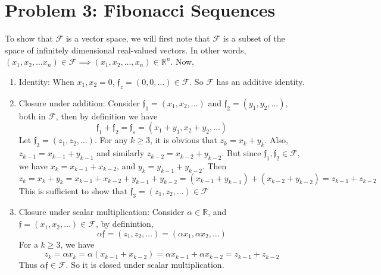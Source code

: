 \documentclass{article}
\begin{document}
\section*{Problem 3: Fibonacci Sequences}
 To show that $\mathcal{F}$ is a vector space, we will first note that $\mathcal{F}$ is a subset of the space of infinitely dimensional real-valued vectors. In other words, $(x_{1},x_{2},\dots x_{n})\in \mathcal{F} \implies (x_{1},x_{2},\dots, x_{n})\in\mathbb{R}^{n}$. Now,
\begin{enumerate}
    \item Identity: When $x_{1}, x_{2} = 0$, $\mathfrak{f}_{z} = (0,0,\dots) \in \mathcal{F}$. So $\mathcal{F}$ has an additive identity.
    \item Closure under addition: Consider $\mathfrak{f}_{1} = (x_{1},x_{2},\dots)$ and $\mathfrak{f}_{2} = (y_{1}, y_{2}, \dots)$, both in $\mathcal{F}$, then by definition we have
    \begin{equation*}
        \mathfrak{f}_{1} + \mathfrak{f}_{2} = \mathfrak{f}_{s} = (x_{1} + y_{1}, x_{2} + y_{2}, \dots)
    \end{equation*}
    Let $\mathfrak{f}_{3} = (z_{1}, z_{2}, \dots)$. For any $k \geq 3$, it is obvious that $z_{k} = x_{k} + y_{k}$. Also, $z_{k - 1} = x_{k-1} + y_{k-1}$ and similarly $z_{k-2} = x_{k-2} + y_{k-2}$. But since $\mathfrak{f}_{1},\mathfrak{f}_{2}\in \mathcal{F}$, we have $x_{k} = x_{k - 1} + x_{k-2}$, and $y_{k} = y_{k-1} + y_{k-2}$. Then
    \begin{equation*}
        z_{k} = x_{k} + y_{k} = x_{k-1} + x_{k-2} + y_{k-1} + y_{k-2} = (x_{k-1} + y_{k-1}) + (x_{k-2} + y_{k-2}) = z_{k-1} + z_{k-2}
    \end{equation*}
    This is sufficient to show that $\mathfrak{f}_{3} = (z_{1},z_{2},\dots)\in \mathcal{F}$
    \item Closure under scalar multiplication: Consider $\alpha \in \mathbb{R}$, and $\mathfrak{f} = (x_{1}, x_{2},\dots) \in \mathcal{F}$, by definintion,
    \begin{equation*}
        \alpha \mathfrak{f} = (z_{1},z_{2}, \dots) = (\alpha x_{1}, \alpha x_{2}, \dots)
    \end{equation*}
    For a $k \geq 3$, we have 
    \begin{equation*}
        z_{k} = \alpha x_{k} = \alpha (x_{k-1} + x_{k-2}) = \alpha x_{k-1} + \alpha x_{k-2} = z_{k-1} + z_{k-2}
    \end{equation*}
    Thus $\alpha \mathfrak{f} \in \mathcal{F}$. So it is closed under scalar multiplication. 
\end{enumerate}
\end{document}

